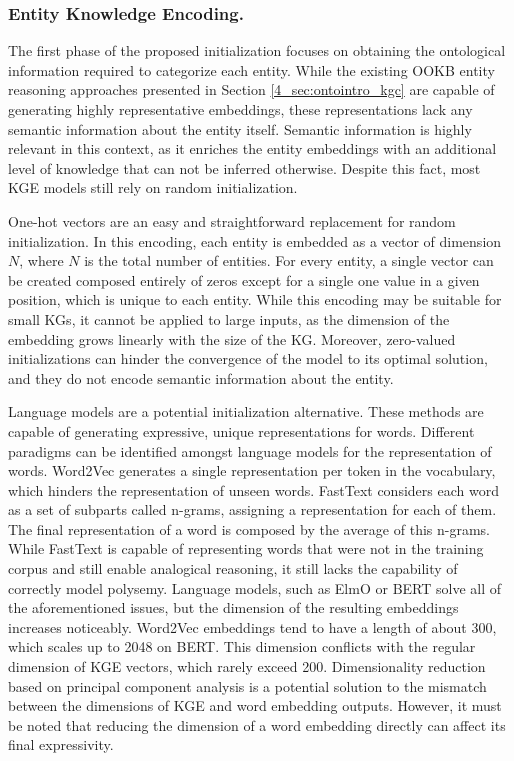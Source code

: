 \subsubsection{Entity Knowledge Encoding.}\label{subsec:s4_entity_encode}
The first phase of the proposed initialization focuses on obtaining the ontological information required to categorize each entity. While the existing OOKB entity reasoning approaches presented in Section \ref{4_sec:ontointro_kgc} are capable of generating highly representative embeddings, these representations lack any semantic information about the entity itself. Semantic information is highly relevant in this context, as it enriches the entity embeddings with an additional level of knowledge that can not be inferred otherwise. Despite this fact, most KGE models still rely on random initialization. 

One-hot vectors are an easy and straightforward replacement for random initialization. In this encoding, each entity is embedded as a vector of dimension $N$, where $N$ is the total number of entities. For every entity, a single vector can be created composed entirely of zeros except for a single one value in a given position, which is unique to each entity. While this encoding may be suitable for small KGs, it cannot be applied to large inputs, as the dimension of the embedding grows linearly with the size of the KG. Moreover, zero-valued initializations can hinder the convergence of the model to its optimal solution, and they do not encode semantic information about the entity.

Language models are a potential initialization alternative. These methods are capable of generating expressive, unique representations for words. Different paradigms can be identified amongst language models for the representation of words. Word2Vec \citep{word2vec} generates a single representation per token in the vocabulary, which hinders the representation of unseen words. FastText \citep{fasttext1,fasttext2} considers each word as a set of subparts called n-grams, assigning a representation for each of them. The final representation of a word is composed by the average of this n-grams. While FastText is capable of representing words that were not in the training corpus and still enable analogical reasoning, it still lacks the capability of correctly model polysemy. Language models, such as ElmO \citep{elmo} or BERT \citep{bert} solve all of the aforementioned issues, but the dimension of the resulting embeddings increases noticeably. Word2Vec embeddings tend to have a length of about 300, which scales up to 2048 on BERT. This dimension conflicts with the regular dimension of KGE vectors, which rarely exceed 200. Dimensionality reduction based on principal component analysis is a potential solution to the mismatch between the dimensions of KGE and word embedding outputs. However, it must be noted that reducing the dimension of a word embedding directly can affect its final expressivity. 

